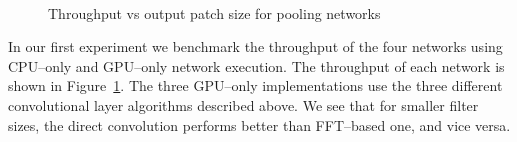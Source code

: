 \documentclass[conference]{IEEEtran}
\begin{document}
  \begin{figure}[h!t]
    \centering
    \\

    \caption{Throughput vs output patch size for pooling networks
    }
    \label{fig:experiments1}
  \end{figure}

  In our first experiment we benchmark the throughput of the four
  networks using CPU--only and GPU--only network execution.  The
  throughput of each network is shown in
  Figure~\ref{fig:experiments1}.  The three GPU--only implementations
  use the three different convolutional layer algorithms described
  above.  We see that for smaller filter sizes, the direct convolution
  performs better than FFT--based one, and vice versa.
\end{document}
